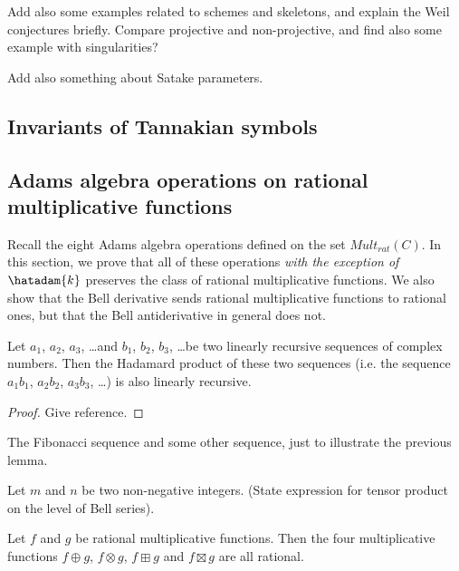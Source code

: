 \documentclass[a4paper]{article}
\begin{document}
Add also some examples related to schemes and skeletons, and explain the Weil conjectures briefly. Compare projective and non-projective, and find also some example with singularities?

Add also something about Satake parameters.


\subsection{Invariants of Tannakian symbols}





\subsection{Adams algebra operations on rational multiplicative functions}

Recall the eight Adams algebra operations defined on the set $Mult_{rat}(C)$. In this section, we prove that all of these operations \emph{with the exception of $\hatadam{k}$} preserves the class of rational multiplicative functions. We also show that the Bell derivative sends rational multiplicative functions to rational ones, but that the Bell antiderivative in general does not.

\begin{lemma}
Let $a_1$, $a_2$, $a_3$, \ldots and $b_1$, $b_2$, $b_3$, \ldots be two linearly recursive sequences of complex numbers. Then the Hadamard product of these two sequences (i.e. the sequence $a_1 b_1$, $a_2 b_2$, $a_3 b_3$, \ldots) is also linearly recursive.
\end{lemma}
\begin{proof}
Give reference.
\end{proof}

\begin{example}
The Fibonacci sequence and some other sequence, just to illustrate the previous lemma. 
\end{example}

\begin{lemma}
Let $m$ and $n$ be two non-negative integers. (State expression for tensor product on the level of Bell series).
\end{lemma}

\begin{theorem}

Let $f$ and $g$ be rational multiplicative functions. Then the four multiplicative functions $f \oplus g$, $f \otimes g$, $f \boxplus g$ and $f \boxtimes g$ are all rational.
\end{theorem}
\end{document}
